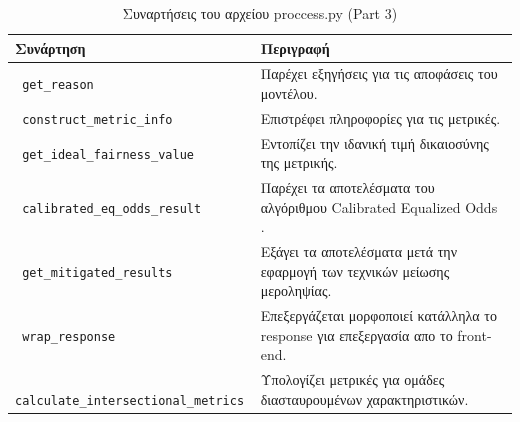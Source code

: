 \documentclass[12pt,twoside]{article}
\newcommand{\en}{\selectlanguage{english}}
\newcommand{\gr}{\selectlanguage{greek}}
\begin{document}
\newpage
\begin{table}[H]
\centering
\caption{\gr Συναρτήσεις του αρχείου \en proccess.py (Part 3)}
\begin{tabular}{|p{7cm}|p{7cm}|}
\hline
\textbf{\gr Συνάρτηση} & \textbf{\gr Περιγραφή} \\ \hline
\texttt{ \en get\_reason} & \gr Παρέχει εξηγήσεις για τις αποφάσεις του μοντέλου. \\ \hline
\texttt{ \en construct\_metric\_info} & \gr Επιστρέφει πληροφορίες για τις μετρικές. \\ \hline
\texttt{ \en get\_ideal\_fairness\_value} & \gr Εντοπίζει την ιδανική τιμή δικαιοσύνης της μετρικής. \\ \hline
\texttt{ \en calibrated\_eq\_odds\_result} & \gr Παρέχει τα αποτελέσματα του αλγόριθμου \en Calibrated Equalized Odds \gr. \\ \hline
\texttt{ \en get\_mitigated\_results} & \gr Εξάγει τα αποτελέσματα μετά την εφαρμογή των τεχνικών μείωσης μεροληψίας. \\ \hline
\texttt{ \en wrap\_response} & \gr Επεξεργάζεται μορφοποιεί κατάλληλα το \en response \gr  για επεξεργασία απο το \en front-end. \\ \hline
\texttt{ \en calculate\_intersectional\_metrics} & \gr Υπολογίζει μετρικές  για ομάδες διασταυρουμένων χαρακτηριστικών. \\ \hline
\end{tabular}
\end{table}
\end{document}
